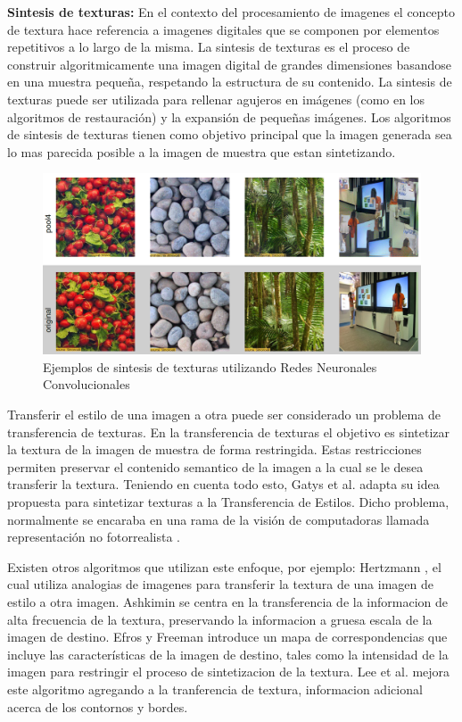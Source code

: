 \documentclass[a4paper,11pt,spanish]{book}
\begin{document}
      \textbf{Sintesis de texturas:}
      En el contexto del procesamiento de imagenes el concepto de textura hace referencia a imagenes digitales que se componen por elementos repetitivos a lo largo de la misma.
      La sintesis de texturas es el proceso de construir algoritmicamente una imagen digital de grandes dimensiones basandose en una muestra pequeña, respetando la estructura de su contenido. 
      La sintesis de texturas puede ser utilizada para rellenar agujeros en imágenes (como en los algoritmos de restauración) y la expansión de pequeñas imágenes.
      Los algoritmos de sintesis de texturas tienen como objetivo principal que la imagen generada sea lo mas parecida posible a la imagen de muestra que estan sintetizando.
      
      \begin{figure}[H]
	\begin{center}
	  \includegraphics[width=0.8\linewidth]{./img/textures.png}
	\end{center}
	\caption{Ejemplos de sintesis de texturas utilizando Redes Neuronales Convolucionales}
	\label{fig:textures}
      \end{figure}
    
      Transferir el estilo de una imagen a otra puede ser considerado un problema de transferencia de texturas. 
      En la transferencia de texturas el objetivo es sintetizar la textura de la imagen de muestra de forma restringida.
      Estas restricciones permiten preservar el contenido semantico de la imagen a la cual se le desea transferir la textura.
      Teniendo en cuenta todo esto, Gatys et al. adapta su idea propuesta para sintetizar texturas a la Transferencia de Estilos.
      Dicho problema, normalmente se encaraba en una rama de la visión de computadoras llamada representación no fotorrealista \cite{Kyprianidis:ArtisticStylization}.
      
      Existen otros algoritmos que utilizan este enfoque, por ejemplo: 
      Hertzmann \cite{Hertzmann:ImageAnalogies}, el cual utiliza analogias de imagenes para transferir la textura de una imagen de estilo a otra imagen. 
      Ashkimin \cite{Ashikhmin:FastTextureTransfer} se centra en la transferencia de la informacion de alta frecuencia de la textura, preservando la informacion a gruesa escala de 
      la imagen de destino. 
      Efros y Freeman \cite{Efros:ImageQuilting} introduce un mapa de correspondencias que incluye las características de la imagen de destino, tales como la intensidad 
      de la imagen para restringir el proceso de sintetizacion de la textura.
      Lee et al. \cite{Lee:DirectionalTextureTransfer} mejora este algoritmo agregando a la tranferencia de textura, informacion adicional acerca de los contornos y bordes.
      
\end{document}
